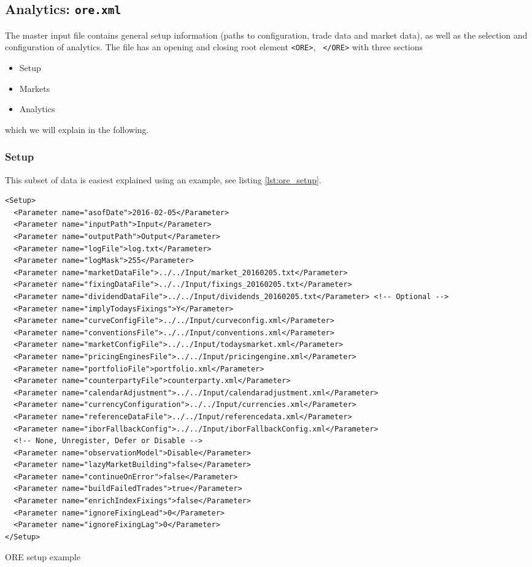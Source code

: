 \subsection{Analytics: {\tt ore.xml}}\label{sec:master_input}

The master input file contains general setup information (paths to configuration, trade data and market data), as well
as the selection and configuration of analytics. The file has an opening and closing root element {\tt <ORE>}, {\tt
  </ORE>} with three sections
\begin{itemize}
\item Setup
\item Markets
\item Analytics
\end{itemize}
which we will explain in the following.

\subsubsection*{Setup}

This subset of data is easiest explained using an example, see listing \ref{lst:ore_setup}.
\begin{listing}[H]
\begin{verbatim}
<Setup>
  <Parameter name="asofDate">2016-02-05</Parameter>
  <Parameter name="inputPath">Input</Parameter>
  <Parameter name="outputPath">Output</Parameter>
  <Parameter name="logFile">log.txt</Parameter>
  <Parameter name="logMask">255</Parameter>
  <Parameter name="marketDataFile">../../Input/market_20160205.txt</Parameter>
  <Parameter name="fixingDataFile">../../Input/fixings_20160205.txt</Parameter>
  <Parameter name="dividendDataFile">../../Input/dividends_20160205.txt</Parameter> <!-- Optional -->
  <Parameter name="implyTodaysFixings">Y</Parameter>
  <Parameter name="curveConfigFile">../../Input/curveconfig.xml</Parameter>
  <Parameter name="conventionsFile">../../Input/conventions.xml</Parameter>
  <Parameter name="marketConfigFile">../../Input/todaysmarket.xml</Parameter>
  <Parameter name="pricingEnginesFile">../../Input/pricingengine.xml</Parameter>
  <Parameter name="portfolioFile">portfolio.xml</Parameter>
  <Parameter name="counterpartyFile">counterparty.xml</Parameter>
  <Parameter name="calendarAdjustment">../../Input/calendaradjustment.xml</Parameter>
  <Parameter name="currencyConfiguration">../../Input/currencies.xml</Parameter>
  <Parameter name="referenceDataFile">../../Input/referencedata.xml</Parameter>
  <Parameter name="iborFallbackConfig">../../Input/iborFallbackConfig.xml</Parameter>
  <!-- None, Unregister, Defer or Disable -->
  <Parameter name="observationModel">Disable</Parameter>
  <Parameter name="lazyMarketBuilding">false</Parameter>
  <Parameter name="continueOnError">false</Parameter>
  <Parameter name="buildFailedTrades">true</Parameter>
  <Parameter name="enrichIndexFixings">false</Parameter>
  <Parameter name="ignoreFixingLead">0</Parameter>
  <Parameter name="ignoreFixingLag">0</Parameter>
</Setup>
\end{verbatim}
\caption{ORE setup example}
\label{lst:ore_setup}
\end{listing}


